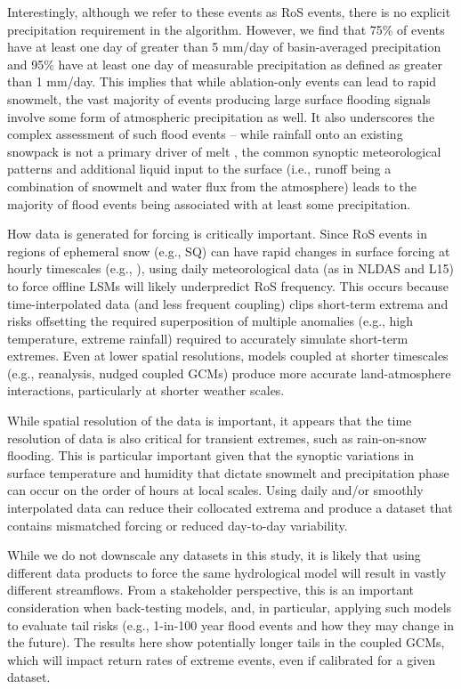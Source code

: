 \documentclass[draft]{agujournal2019}
\begin{document}
Interestingly, although we refer to these events as RoS events, there is no explicit precipitation requirement in the algorithm. However, we find that 75\% of events have at least one day of greater than 5 mm/day of basin-averaged precipitation and 95\% have at least one day of measurable precipitation as defined as greater than 1 mm/day. This implies that while ablation-only events can lead to rapid snowmelt, the vast majority of events producing large surface flooding signals involve some form of atmospheric precipitation as well. It also underscores the complex assessment of such flood events -- while rainfall onto an existing snowpack is not a primary driver of melt \citep{harpold2018humidity}, the common synoptic meteorological patterns \citep{grote2021synoptic} and additional liquid input to the surface (i.e., runoff being a combination of snowmelt and water flux from the atmosphere) leads to the majority of flood events being associated with at least some precipitation.

How data is generated for forcing is critically important. Since RoS events in regions of ephemeral snow (e.g., SQ) can have rapid changes in surface forcing at hourly timescales (e.g., \citet{leathers1998severe}), using daily meteorological data (as in NLDAS and L15) to force offline LSMs will likely underpredict RoS frequency. This occurs because time-interpolated data (and less frequent coupling) clips short-term extrema and risks offsetting the required superposition of multiple anomalies (e.g., high temperature, extreme rainfall) required to accurately simulate short-term extremes. Even at lower spatial resolutions, models coupled at shorter timescales (e.g., reanalysis, nudged coupled GCMs) produce more accurate land-atmosphere interactions, particularly at shorter weather scales.

While spatial resolution of the data is important, it appears that the time resolution of data is also critical for transient extremes, such as rain-on-snow flooding. This is particular important given that the synoptic variations in surface temperature and humidity that dictate snowmelt and precipitation phase can occur on the order of hours at local scales. Using daily and/or smoothly interpolated data can reduce their collocated extrema and produce a dataset that contains mismatched forcing or reduced day-to-day variability.

While we do not downscale any datasets in this study, it is likely that using different data products to force the same hydrological model will result in vastly different streamflows. From a stakeholder perspective, this is an important consideration when back-testing models, and, in particular, applying such models to evaluate tail risks (e.g., 1-in-100 year flood events and how they may change in the future). The results here show potentially longer tails in the coupled GCMs, which will impact return rates of extreme events, even if calibrated for a given dataset.
\end{document}

